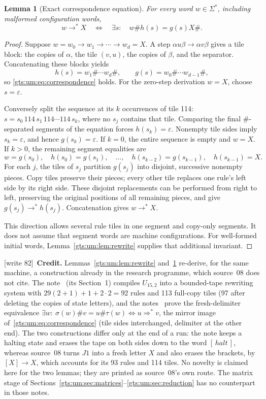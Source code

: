 \documentclass[11pt,letterpaper]{article}
\newtheorem{lemma}[theorem]{Lemma}
\theoremstyle{definition}
\theoremstyle{remark}
\newcommand{\eps}{\varepsilon}
\newcommand{\hto}{\mathrel{\longrightarrow}}
\newcommand{\st}{\mathrel{\longrightarrow^{*}}}
\newcommand{\wtagc}{\textup{[write 82]}}
\begin{document}
\begin{lemma}[Exact correspondence equation]\label{gts:um:lem:tiles}
For every word $w\in\Sigma^*$, including malformed configuration words,
\begin{equation}\label{gts:um:eq:correspondence}
 w\st X\quad\Longleftrightarrow\quad
 \exists s:\quad w\#h(s)=g(s)X\#.
\end{equation}
\end{lemma}
\begin{proof}
Suppose $w=w_0\hto w_1\hto\cdots\hto w_d=X$. A step $\alpha u\beta\hto\alpha v\beta$ gives a tile block: the copies of $\alpha$, the tile $(v,u)$, the copies of $\beta$, and the separator. Concatenating these blocks yields
\[
 h(s)=w_1\#\cdots w_d\#,\qquad
 g(s)=w_0\#\cdots w_{d-1}\#,
\]
so \eqref{gts:um:eq:correspondence} holds. For the zero-step derivation $w=X$, choose $s=\eps$.

Conversely split the sequence at its $k$ occurrences of tile 114:
$s=s_0\,114\,s_1\,114\cdots114\,s_k$, where no $s_j$ contains that tile. Comparing the final $\#$-separated segments of the equation forces $h(s_k)=\eps$. Nonempty tile sides imply $s_k=\eps$, and hence $g(s_k)=\eps$. If $k=0$, the entire sequence is empty and $w=X$. If $k>0$, the remaining segment equalities are
\[
 w=g(s_0),\quad h(s_0)=g(s_1),\quad\ldots,\quad
 h(s_{k-2})=g(s_{k-1}),\quad h(s_{k-1})=X.
\]
For each $j$, the tiles of $s_j$ partition $g(s_j)$ into disjoint, successive nonempty pieces. Copy tiles preserve their pieces; every other tile replaces one rule's left side by its right side. These disjoint replacements can be performed from right to left, preserving the original positions of all remaining pieces, and give $g(s_j)\st h(s_j)$. Concatenation gives $w\st X$.

This direction allows several rule tiles in one segment and copy-only segments. It does not assume that segment words are machine configurations. For well-formed initial words, Lemma~\ref{gts:um:lem:rewrite} supplies that additional invariant.
\end{proof}

\wtagc\ \textbf{Credit.} Lemmas~\ref{gts:um:lem:rewrite} and~\ref{gts:um:lem:tiles} re-derive, for the same machine, a construction already in the research programme, which source~08 does not cite. The note~\cite{repo-nw15} (its Section~1) compiles $U_{15,2}$ into a bounded-tape rewriting system with $29(2+1)+1+2\cdot2=92$ rules and 113 full-copy tiles (97 after deleting the copies of state letters), and the notes~\cite{repo-gpcp} prove the fresh-delimiter equivalence $\exists w:\ \sigma(w)\#v=u\#\tau(w)\iff u\Rightarrow^*v$, the mirror image of~\eqref{gts:um:eq:correspondence} (tile sides interchanged, delimiter at the other end). The two constructions differ only at the end of a run: the note keeps a halting state and erases the tape on both sides down to the word $[\,\mathit{halt}\,]$, whereas source~08 turns $J1$ into a fresh letter $X$ and also erases the brackets, by $[X]\hto X$, which accounts for its 93 rules and 114 tiles. No novelty is claimed here for the two lemmas; they are printed as source~08's own route. The matrix stage of Sections~\ref{gts:um:sec:matrices}--\ref{gts:um:sec:reduction} has no counterpart in those notes.
\end{document}
